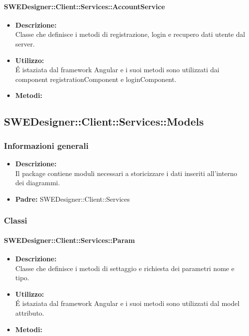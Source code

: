          	\paragraph{SWEDesigner::Client::Services::AccountService}
				\begin{itemize}
          			\item \textbf{Descrizione:}\\
          			Classe che definisce i metodi di registrazione, login e recupero dati utente dal server.
          			\item \textbf{Utilizzo:}\\
          			É istaziata dal framework Angular e i suoi metodi sono utilizzati dai component registrationComponent e loginComponent.
          			\item \textbf{Metodi:}\\
          		\end{itemize}
	\subsection{SWEDesigner::Client::Services::Models}
		\subsubsection{Informazioni generali}
			\begin{itemize}
          		\item \textbf{Descrizione:}\\
          		Il package contiene moduli necessari a storicizzare i dati inseriti all’interno
dei diagrammi.
          		\item \textbf{Padre:} SWEDesigner::Client::Services
          	\end{itemize}
		\subsubsection{Classi}
			\paragraph{SWEDesigner::Client::Services::Param}
				\begin{itemize}
          			\item \textbf{Descrizione:}\\
          			Classe che definisce i metodi di settaggio e richiesta dei parametri nome e tipo.
          			\item \textbf{Utilizzo:}\\
          			É istaziata dal framework Angular e i suoi metodi sono utilizzati dal model attributo.
          			\item \textbf{Metodi:}\\
          		\end{itemize}
